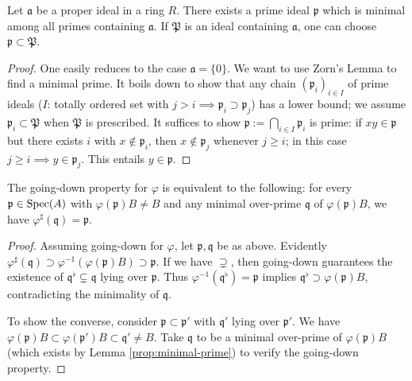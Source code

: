 \begin{lemma}\label{prop:minimal-prime}
	Let $\mathfrak{a}$ be a proper ideal in a ring $R$. There exists a prime ideal $\mathfrak{p}$ which is minimal among all primes containing $\mathfrak{a}$. If $\mathfrak{P}$ is an ideal containing $\mathfrak{a}$, one can choose $\mathfrak{p} \subset \mathfrak{P}$.
\end{lemma}
\begin{proof}
	One easily reduces to the case $\mathfrak{a} = \{0\}$. We want to use Zorn's Lemma to find a minimal prime. It boils down to show that any chain $(\mathfrak{p}_i)_{i \in I}$ of prime ideals ($I$: totally ordered set with $j > i \implies \mathfrak{p}_i \supset \mathfrak{p}_j$) has a lower bound; we assume $\mathfrak{p}_i \subset \mathfrak{P}$ when $\mathfrak{P}$ is prescribed. It suffices to show $\mathfrak{p} := \bigcap_{i \in I} \mathfrak{p}_i$ is prime: if $xy \in \mathfrak{p}$ but there exists $i$ with $x \notin \mathfrak{p}_i$, then $x \notin \mathfrak{p}_j$ whenever $j \geq i$; in this case $j \geq i \implies y \in \mathfrak{p}_j$. This entails $y \in \mathfrak{p}$.
\end{proof}

\begin{lemma}
	The going-down property for $\varphi$ is equivalent to the following: for every $\mathfrak{p} \in \operatorname{Spec}(A)$ with $\varphi(\mathfrak{p})B \neq B$ and any minimal over-prime $\mathfrak{q}$ of $\varphi(\mathfrak{p})B$, we have $\varphi^\sharp(\mathfrak{q}) = \mathfrak{p}$.
\end{lemma}
\begin{proof}
	Assuming going-down for $\varphi$, let $\mathfrak{p}, \mathfrak{q}$ be as above. Evidently $\varphi^\sharp(\mathfrak{q}) \supset \varphi^{-1}(\varphi(\mathfrak{p})B) \supset \mathfrak{p}$. If we have $\supsetneq$, then going-down guarantees the existence of $\mathfrak{q}^\flat \subsetneq \mathfrak{q}$ lying over $\mathfrak{p}$. Thus $\varphi^{-1}(\mathfrak{q}^\flat) = \mathfrak{p}$ implies $\mathfrak{q}^\flat \supset \varphi(\mathfrak{p})B$, contradicting the minimality of $\mathfrak{q}$.
	
	To show the converse, consider $\mathfrak{p} \subset \mathfrak{p}'$ with $\mathfrak{q}'$ lying over $\mathfrak{p}'$. We have $\varphi(\mathfrak{p})B \subset \varphi(\mathfrak{p}')B \subset \mathfrak{q}' \neq B$. Take $\mathfrak{q}$ to be a minimal over-prime of $\varphi(\mathfrak{p})B$ (which exists by Lemma \ref{prop:minimal-prime}) to verify the going-down property.
\end{proof}

